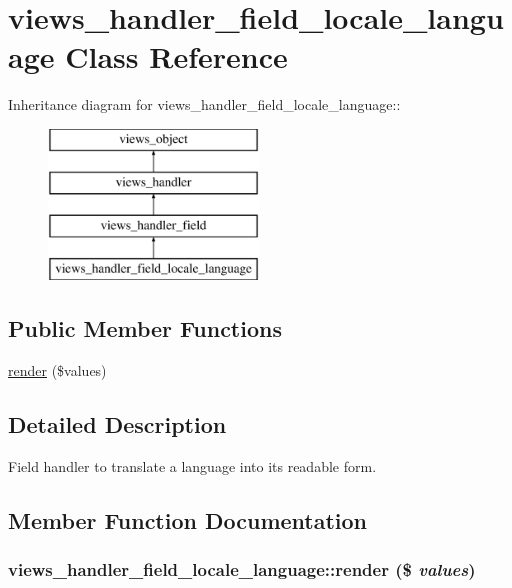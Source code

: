 \hypertarget{classviews__handler__field__locale__language}{
\section{views\_\-handler\_\-field\_\-locale\_\-language Class Reference}
\label{classviews__handler__field__locale__language}
}
Inheritance diagram for views\_\-handler\_\-field\_\-locale\_\-language::\begin{figure}[H]
\begin{center}
\leavevmode
\includegraphics[height=4cm]{classviews__handler__field__locale__language}
\end{center}
\end{figure}
\subsection*{Public Member Functions}
\begin{CompactItemize}
\item 
\hyperlink{classviews__handler__field__locale__language_9aee281e240225b4a6f4465afcb8cdbf}{render} (\$values)
\end{CompactItemize}


\subsection{Detailed Description}
Field handler to translate a language into its readable form. 

\subsection{Member Function Documentation}
\hypertarget{classviews__handler__field__locale__language_9aee281e240225b4a6f4465afcb8cdbf}{
\subsubsection[{render}]{\setlength{\rightskip}{0pt plus 5cm}views\_\-handler\_\-field\_\-locale\_\-language::render (\$ {\em values})}}
\label{classviews__handler__field__locale__language_9aee281e240225b4a6f4465afcb8cdbf}


